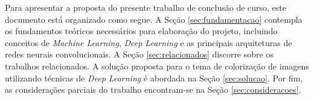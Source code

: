 Para apresentar a proposta do presente trabalho de conclusão de curso, este documento está organizado como segue. A Seção \ref{sec:fundamentacao} contempla os fundamentos teóricos necessários para elaboração do projeto, incluindo conceitos de \textit{Machine Learning}, \textit{Deep Learning} e as principais arquiteturas de redes neurais convolucionais. A Seção \ref{sec:relacionados} discorre sobre os trabalhos relacionados. A solução proposta para o tema de colorização de imagens utilizando técnicas de \textit{Deep Learning} é abordada na Seção \ref{sec:solucao}. Por fim, as considerações parciais do trabalho encontram-se na Seção \ref{sec:consideracoes}.